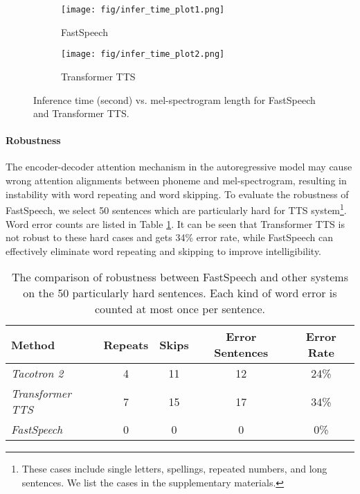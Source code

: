 \documentclass{article}
\begin{document}
\begin{figure*}[h] 
	\centering
	\begin{subfigure}[h]{0.49\textwidth}
		\centering
		\label{fig_lat_plot1}
		\texttt{[image: fig/infer\_time\_plot1.png]}
		\caption{FastSpeech}
	\end{subfigure}
	\begin{subfigure}[h]{0.47\textwidth}
		\centering
		\label{fig_lat_plot2}
		\texttt{[image: fig/infer\_time\_plot2.png]}
		\caption{Transformer TTS}
	\end{subfigure}
	\caption{Inference time (second) vs. mel-spectrogram length for FastSpeech and Transformer TTS.}
	\label{fig_lat_plot}
\end{figure*}


\paragraph{Robustness}
\label{exp_robustness}
The encoder-decoder attention mechanism in the autoregressive model may cause wrong attention alignments between phoneme and mel-spectrogram, resulting in instability with word repeating and word skipping. To evaluate the robustness of FastSpeech, we select 50 sentences which are particularly hard for TTS system\footnote{These cases include single letters, spellings, repeated numbers, and long sentences. We list the cases in the supplementary materials.}. Word error counts are listed in Table \ref{tab_wer_results}. It can be seen that Transformer TTS is not robust to these hard cases and gets 34\% error rate, while FastSpeech can effectively eliminate word repeating and skipping to improve intelligibility.

\begin{table}[h]
	\centering
	\begin{tabular}{ l | c | c | c | c }
		\toprule
		Method & Repeats & Skips & Error Sentences & Error Rate  \\
		\midrule
		\textit{Tacotron 2} & 4 & 11 & 12 & 24\% \\
		\textit{Transformer TTS} & 7 & 15 & 17 & 34\% \\
		\midrule
		\textit{FastSpeech} & 0 & 0 & 0 & 0\%  \\
		\bottomrule
	\end{tabular}
	\vspace{0.3cm}
	\caption{The comparison of robustness between FastSpeech and other systems on the 50 particularly hard sentences. Each kind of word error is counted at most once per sentence.}
	\vspace{-0.2cm}
	\label{tab_wer_results}
\end{table}
\end{document}
